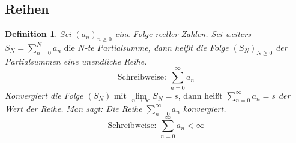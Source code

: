 \documentclass[a4paper,titlepage,oneside]{article}
\newcommand{\suminf}[2][n]{\ensuremath{\sum_{#1= 0}^{\infty}{#2}}}
\renewcommand{\liminf}[2][n]{\ensuremath{\lim\limits_{#1 \rightarrow \infty}{#2}}}
\theoremstyle{thmstyle}
\newtheorem{defi}[satz]{Definition}
\begin{document}
\subsection{Reihen}

\begin{defi}
Sei \((a_n)_{n \ge 0}\) eine Folge reeller Zahlen. Sei weiters \(S_N = \sum_{n = 0}^{N}{a_n} \text{ die }N\)-te Partialsumme, dann heißt die Folge \((S_N)_{N \ge 0}\) der Partialsummen eine unendliche Reihe.\\
\[\text{Schreibweise: }\suminf{a_n}\]
Konvergiert die Folge \((S_N)\text{ mit }\liminf{S_N} = s \text{, dann heißt } \suminf{a_n} = s\) der Wert der Reihe. Man sagt: Die Reihe \(\suminf{a_n}\) konvergiert.
\[\text{Schreibweise: } \suminf{a_n} < \infty\]
\end{defi}
\end{document}
